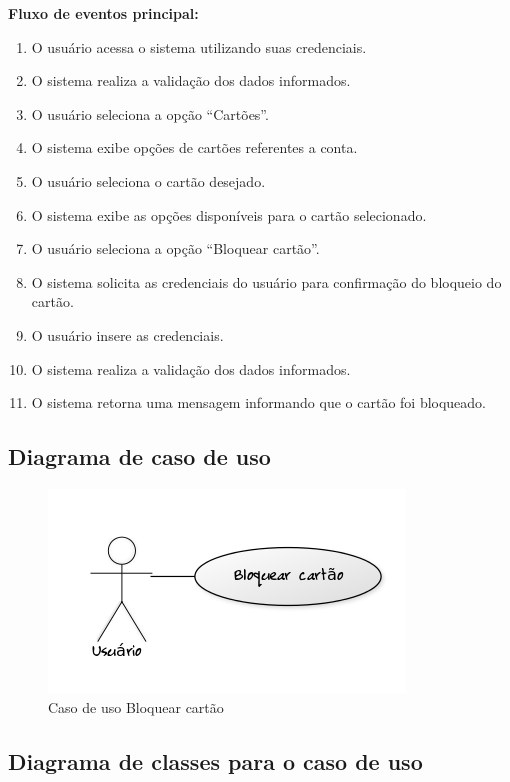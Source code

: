 \textbf{Fluxo de eventos principal:}

\begin{enumerate}
  \item O usuário acessa o sistema utilizando suas credenciais.
  \item O sistema realiza a validação dos dados informados.
  \item O usuário seleciona a opção ``Cartões''.
  \item O sistema exibe opções de cartões referentes a conta.
  \item O usuário seleciona o cartão desejado.
  \item O sistema exibe as opções disponíveis para o cartão selecionado.
  \item O usuário seleciona a opção ``Bloquear cartão''.
  \item O sistema solicita as credenciais do usuário para confirmação do bloqueio do cartão.
  \item O usuário insere as credenciais.
  \item O sistema realiza a validação dos dados informados.
  \item O sistema retorna uma mensagem informando que o cartão foi bloqueado.
\end{enumerate}

\subsection{Diagrama de caso de uso}

\begin{figure}[!htb]
     \centering
     \includegraphics[scale=0.6]{diagramas/caso-de-uso/imagens/bloquearCartao.png}
     \caption{Caso de uso Bloquear cartão}
\end{figure}

\subsection{Diagrama de classes para o caso de uso}

